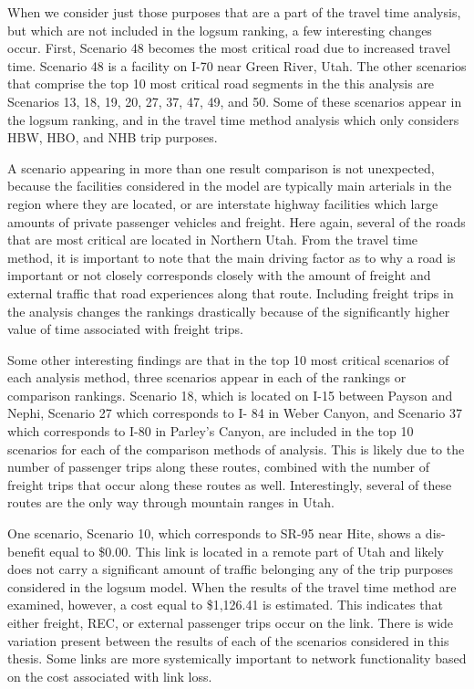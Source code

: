 When we consider just those purposes that are a part of the travel time analysis,
but which are not included in the logsum ranking, a few interesting changes occur.
First, Scenario 48 becomes the most critical road due to increased travel time.
Scenario 48 is a facility on I-70 near Green River, Utah.
The other scenarios that comprise the top 10 most critical road segments
in the this analysis are Scenarios 13, 18, 19, 20, 27, 37, 47, 49, and 50. Some
of these scenarios appear in the logsum ranking, and in the travel time method
analysis which only considers HBW, HBO, and NHB trip purposes.

A scenario appearing in more than one result comparison is not unexpected,
because the facilities considered in the model are typically main
arterials in the region where they are located, or are interstate highway
facilities which large amounts of private passenger vehicles and freight.
Here again, several of the roads that are most critical are located in
Northern Utah. From the travel time method, it is important to note that the main driving factor as to
why a road is important or not closely corresponds closely with
the amount of
freight and external traffic that road experiences along that route. Including freight
trips in the analysis changes the rankings
drastically because of the significantly higher value of time associated
with freight trips.

Some other interesting findings are that in the top 10 most critical scenarios of each analysis
method, three scenarios appear in each of the rankings or comparison rankings. Scenario 18, which is located on
I-15 between Payson and Nephi, Scenario 27 which corresponds to I-
84 in Weber Canyon, and Scenario 37 which corresponds to I-80 in Parley’s Canyon,
are included in the
top 10 scenarios for each of the comparison methods of analysis. This is likely due to the
number of passenger trips along these routes, combined with the number of freight
trips that occur along these routes as well. Interestingly, several of these routes are
the only way through mountain ranges in Utah.

One scenario, Scenario 10, which corresponds to SR-95 near Hite, shows a
dis-benefit equal to \$0.00. This link is located in a remote part of Utah and likely
does not carry a significant amount of traffic belonging any of the trip purposes
considered in the logsum model. When the results of the travel time method are examined,
however, a cost equal to \$1,126.41 is estimated. This indicates that either freight,
REC, or external passenger trips occur on the link. There is wide variation present between
the results of each of the scenarios considered in this thesis. Some links are more
systemically important to network functionality based on the cost associated with
link loss.

